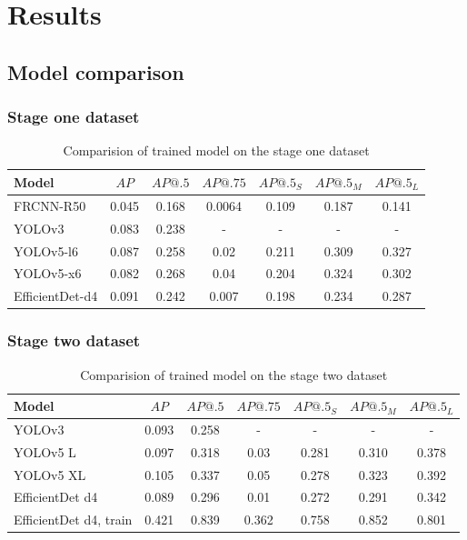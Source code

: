 \chapter{Results}
\label{chapter:results}
\section{Model comparison}
\subsection{Stage one dataset}
\begin{table}[h]
    \centering
    \begin{tabular}{|l|c|c|c|c|c|c|}
        \hline
        Model           & $AP$  & $AP@.5$ & $AP@.75$ & $AP@.5_S$ & $AP@.5_M$ & $AP@.5_L$ \\ \hline
        FRCNN-R50       & 0.045 & 0.168   & 0.0064   & 0.109     & 0.187     & 0.141     \\ \hline
        YOLOv3          & 0.083 & 0.238   & -        & -         & -         & -         \\ \hline
        YOLOv5-l6       & 0.087 & 0.258   & 0.02     & 0.211     & 0.309     & 0.327     \\ \hline
        YOLOv5-x6       & 0.082 & 0.268   & 0.04     & 0.204     & 0.324     & 0.302     \\ \hline
        EfficientDet-d4 & 0.091 & 0.242   & 0.007    & 0.198     & 0.234     & 0.287     \\ \hline
    \end{tabular}
    \caption{Comparision of trained model on the stage one dataset}
    \label{tab:model_results:stage_one}
\end{table}

\subsection{Stage two dataset}

\begin{table}[h]
    \centering
    \begin{tabular}{|l|c|c|c|c|c|c|}
        \hline
        Model                  & $AP$  & $AP@.5$ & $AP@.75$ & $AP@.5_S$ & $AP@.5_M$ & $AP@.5_L$ \\ \hline
        YOLOv3                 & 0.093 & 0.258   & -        & -         & -         & -         \\ \hline
        YOLOv5 L               & 0.097 & 0.318   & 0.03     & 0.281     & 0.310     & 0.378     \\ \hline
        YOLOv5 XL              & 0.105 & 0.337   & 0.05     & 0.278     & 0.323     & 0.392     \\ \hline
        EfficientDet d4        & 0.089 & 0.296   & 0.01     & 0.272     & 0.291     & 0.342     \\ \hline
        EfficientDet d4, train & 0.421 & 0.839   & 0.362    & 0.758     & 0.852     & 0.801     \\ \hline
    \end{tabular}
    \caption{Comparision of trained model on the stage two dataset}
    \label{tab:model_results:stage_two}
\end{table}

